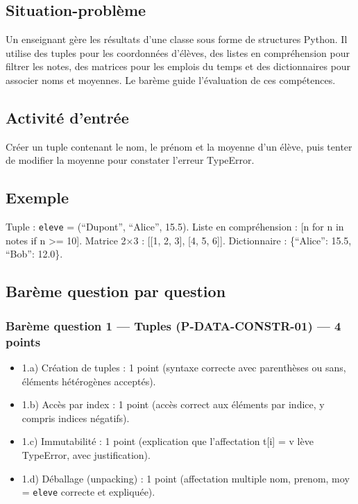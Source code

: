 \subsection{Situation-problème}

Un enseignant gère les résultats d'une classe sous forme de structures
Python. Il utilise des tuples pour les coordonnées d'élèves, des listes
en compréhension pour filtrer les notes, des matrices pour les emplois
du temps et des dictionnaires pour associer noms et moyennes. Le barème
guide l'évaluation de ces compétences.

\subsection{Activité d’entrée}

Créer un tuple contenant le nom, le prénom et la moyenne d'un élève,
puis tenter de modifier la moyenne pour constater l'erreur TypeError.

\subsection{Exemple}

Tuple : \lstinline|eleve| = (``Dupont'', ``Alice'', 15.5). Liste en compréhension :
{[}n for n in notes if n \textgreater= 10{]}. Matrice 2×3 : {[}{[}1, 2,
3{]}, {[}4, 5, 6{]}{]}. Dictionnaire : \{``Alice'': 15.5, ``Bob'':
12.0\}.

\subsection{Barème question par question}

\subsubsection{Barème question 1 — Tuples (P-DATA-CONSTR-01) — 4 points}

\begin{itemize}
\tightlist
\item
  1.a) Création de tuples : 1 point (syntaxe correcte avec parenthèses
  ou sans, éléments hétérogènes acceptés).
\item
  1.b) Accès par index : 1 point (accès correct aux éléments par indice,
  y compris indices négatifs).
\item
  1.c) Immutabilité : 1 point (explication que l'affectation t{[}i{]} =
  v lève TypeError, avec justification).
\item
  1.d) Déballage (unpacking) : 1 point (affectation multiple nom,
  prenom, moy = \lstinline|eleve| correcte et expliquée).
\end{itemize}

